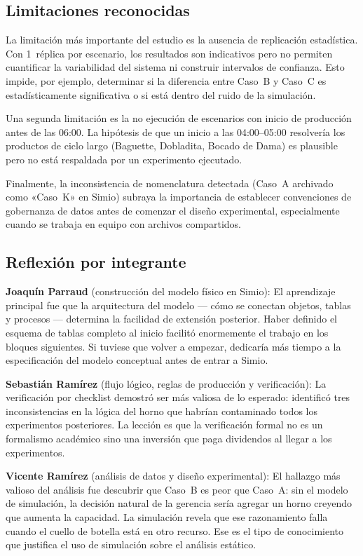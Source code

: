 \documentclass[12pt]{article}
\begin{document}
\subsection{Limitaciones reconocidas}

La limitación más importante del estudio es la ausencia de replicación estadística. Con 1~réplica por escenario, los resultados son indicativos pero no permiten cuantificar la variabilidad del sistema ni construir intervalos de confianza. Esto impide, por ejemplo, determinar si la diferencia entre Caso~B y Caso~C es estadísticamente significativa o si está dentro del ruido de la simulación.

Una segunda limitación es la no ejecución de escenarios con inicio de producción antes de las 06:00. La hipótesis de que un inicio a las 04:00--05:00 resolvería los productos de ciclo largo (Baguette, Dobladita, Bocado de Dama) es plausible pero no está respaldada por un experimento ejecutado.

Finalmente, la inconsistencia de nomenclatura detectada (Caso~A archivado como «Caso~K» en Simio) subraya la importancia de establecer convenciones de gobernanza de datos antes de comenzar el diseño experimental, especialmente cuando se trabaja en equipo con archivos compartidos.

\subsection{Reflexión por integrante}

\textbf{Joaquín Parraud} (construcción del modelo físico en Simio): El aprendizaje principal fue que la arquitectura del modelo --- cómo se conectan objetos, tablas y procesos --- determina la facilidad de extensión posterior. Haber definido el esquema de tablas completo al inicio facilitó enormemente el trabajo en los bloques siguientes. Si tuviese que volver a empezar, dedicaría más tiempo a la especificación del modelo conceptual antes de entrar a Simio.

\textbf{Sebastián Ramírez} (flujo lógico, reglas de producción y verificación): La verificación por checklist demostró ser más valiosa de lo esperado: identificó tres inconsistencias en la lógica del horno que habrían contaminado todos los experimentos posteriores. La lección es que la verificación formal no es un formalismo académico sino una inversión que paga dividendos al llegar a los experimentos.

\textbf{Vicente Ramírez} (análisis de datos y diseño experimental): El hallazgo más valioso del análisis fue descubrir que Caso~B es peor que Caso~A: sin el modelo de simulación, la decisión natural de la gerencia sería agregar un horno creyendo que aumenta la capacidad. La simulación revela que ese razonamiento falla cuando el cuello de botella está en otro recurso. Ese es el tipo de conocimiento que justifica el uso de simulación sobre el análisis estático.
\end{document}
